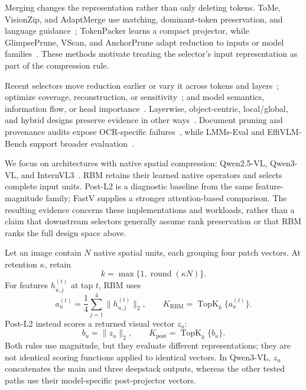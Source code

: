 \documentclass[smallabstract,smallcaptions]{dccpaper}
\begin{document}
Merging changes the representation rather than only deleting tokens. ToMe, VisionZip, and AdaptMerge use matching, dominant-token preservation, and language guidance~\cite{bolya2023tome,yang2024visionzip,islam2025adaptmerge}; TokenPacker learns a compact projector, while GlimpsePrune, VScan, and AnchorPrune adapt reduction to inputs or model families~\cite{li2024tokenpacker,zeng2025glimpseprune,zhang2025vscan,oh2026anchorprune}. These methods motivate treating the selector's input representation as part of the compression rule.

Recent selectors move reduction earlier or vary it across tokens and layers~\cite{gao2026quietprune,wang2026pixelprune,li2026transprune,chen2026v2drop,sun2026hiloprune}; optimize coverage, reconstruction, or sensitivity~\cite{ma2026apet,xu2026score,du2026coin,kim2026zooprune,lee2026spare}; and model semantics, information flow, or head importance~\cite{wang2026metacompress,song2026evocomp,sun2026ifprune,zhu2026hawk}. Layerwise, object-centric, local/global, and hybrid designs preserve evidence in other ways~\cite{wang2026informationhorizon,chen2026alvts,li2026crisp,lei2026core,li2026aot,zhang2026hybrid}. Document pruning and provenance audits expose OCR-specific failures~\cite{choi2026docprune,liu2026provenance}, while LMMs-Eval and EffiVLM-Bench support broader evaluation~\cite{zhang2024lmmseval,wang2025effivlmbench}.

We focus on architectures with native spatial compression: Qwen2.5-VL, Qwen3-VL, and InternVL3~\cite{bai2025qwen25vl,bai2025qwen3vl,zhu2025internvl3}. RBM retains their learned native operators and selects complete input units. Post-L2 is a diagnostic baseline from the same feature-magnitude family; FastV supplies a stronger attention-based comparison. The resulting evidence concerns these implementations and workloads, rather than a claim that downstream selectors generally assume rank preservation or that RBM ranks the full design space above.

Let an image contain $N$ native spatial units, each grouping four patch vectors. At retention $\kappa$, retain
\begin{equation}
k=\max\{1,\operatorname{round}(\kappa N)\}.
\end{equation}
For features $h^{(t)}_{u,j}$ at tap $t$, RBM uses
\begin{equation}
a_u^{(t)}=\frac{1}{4}\sum_{j=1}^{4}\|h^{(t)}_{u,j}\|_2,
\qquad K_{\mathrm{RBM}}=\operatorname{TopK}_k\{a_u^{(t)}\}.
\label{eq:pre}
\end{equation}
Post-L2 instead scores a returned visual vector $z_u$:
\begin{equation}
b_u=\|z_u\|_2,\qquad
K_{\mathrm{post}}=\operatorname{TopK}_k\{b_u\}.
\label{eq:post}
\end{equation}
Both rules use magnitude, but they evaluate different representations; they are not identical scoring functions applied to identical vectors. In Qwen3-VL, $z_u$ concatenates the main and three deepstack outputs, whereas the other tested paths use their model-specific post-projector vectors.
\end{document}
